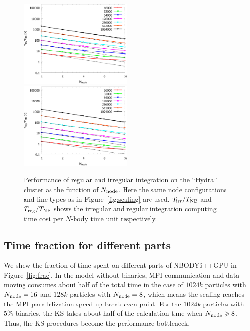 \documentclass[usenatbib,aas_macros]{mn2e}
\def\nbodyppgpu{NBODY6++GPU }
\def\nb{$N$-body }
\begin{document}
\begin{figure}
  \centering
  \includegraphics[width=0.5\textwidth,height=!]{tirr.0.eps}\\
  \includegraphics[width=0.5\textwidth,height=!]{treg.0.eps}
  \caption{Performance of regular and irregular integration on the ``Hydra'' cluster as the function of $N_{\rm node}$. Here the same node configurations and line types as in Figure~\ref{fig:scaling} are used. $T_{\rm irr}/T_{\rm NB}$ and $T_{\rm reg}/T_{\rm NB}$ shows the irregular and regular integration computing time cost per \nb time unit respectively.}
  \label{fig:regirr}
\end{figure}


\subsection{Time fraction for different parts}
\label{sec:tfrac}
We show the fraction of time spent on different parts of \nbodyppgpu in Figure~\ref{fig:frac}.
In the model without binaries, MPI communication and data moving consumes about half of the total time in the case of $1024k$ particles with $N_{\rm node} = 16$ and $128k$ particles with $N_{\rm node} = 8$, 
which means the scaling reaches the MPI parallelization speed-up break-even point. 
For the $1024k$ particles with $5\%$ binaries, the KS takes about half of the calculation time when $N_{\rm node} \ge 8$. 
Thus, the KS procedures become the performance bottleneck.
\end{document}
